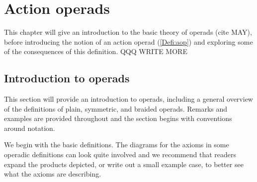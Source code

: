 \section{Action operads}
This chapter will give an introduction to the basic theory of operads (cite MAY), before introducing the notion of an action operad (\ref{Defi:aop}) and exploring some of the consequences of this definition. QQQ WRITE MORE
\subsection{Introduction to operads}
This section will provide an introduction to operads, including a general overview of the definitions of plain, symmetric, and braided operads. Remarks and examples are provided throughout and the section begins with conventions around notation.

We begin with the basic definitions. The diagrams for the axioms in some operadic definitions can look quite involved and we recommend that readers expand the products depicted, or write out a small example case, to better see what the axioms are describing.

